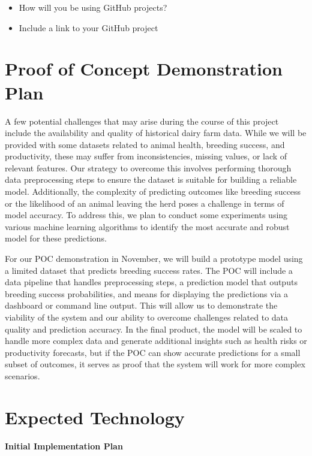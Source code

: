 \documentclass{article}
\begin{document}
\begin{itemize}
  \item How will you be using GitHub projects?
  \item Include a link to your GitHub project
\end{itemize}


\section{Proof of Concept Demonstration Plan}

A few potential challenges that may arise during the course of this project include the availability and quality of historical dairy farm data. While we will be provided with some datasets related to animal health, breeding success, and productivity, these may suffer from inconsistencies, missing values, or lack of relevant features. Our strategy to overcome this involves performing thorough data preprocessing steps to ensure the dataset is suitable for building a reliable model. Additionally, the complexity of predicting outcomes like breeding success or the likelihood of an animal leaving the herd poses a challenge in terms of model accuracy. To address this, we plan to conduct some experiments using various machine learning algorithms to identify the most accurate and robust model for these predictions.

For our POC demonstration in November, we will build a prototype model using a limited dataset that predicts breeding success rates. The POC will include a data pipeline that handles preprocessing steps, a prediction model that outputs breeding success probabilities, and means for displaying the predictions via a dashboard or command line output. This will allow us to demonstrate the viability of the system and our ability to overcome challenges related to data quality and prediction accuracy. In the final product, the model will be scaled to handle more complex data and generate additional insights such as health risks or productivity forecasts, but if the POC can show accurate predictions for a small subset of outcomes, it serves as proof that the system will work for more complex scenarios.

\section{Expected Technology}
\textbf{Initial Implementation Plan}
\end{document}
